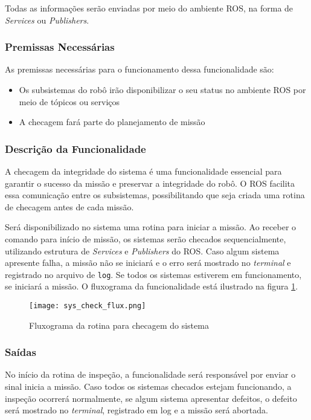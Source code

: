 Todas as informações serão enviadas por meio do ambiente ROS, na forma de \textit{Services} ou \textit{Publishers}.

\subsubsection{Premissas Necessárias}
As premissas necessárias para o funcionamento dessa funcionalidade são:
\begin{itemize}
	\item Os subsistemas do robô irão disponibilizar o seu status no ambiente ROS por meio de tópicos ou serviços
	\item A checagem fará parte do planejamento de missão
\end{itemize}

\subsubsection{Descrição da Funcionalidade}
A checagem da integridade do sistema é uma funcionalidade essencial para garantir o sucesso da missão e preservar a integridade do robô. O ROS facilita essa comunicação entre os subsistemas, possibilitando que seja criada uma rotina de checagem antes de cada missão.

Será disponibilizado no sistema uma rotina para iniciar a missão. Ao receber o comando para início de missão, os sistemas serão checados sequencialmente, utilizando estrutura de \textit{Services} e \textit{Publishers} do ROS. Caso algum sistema apresente falha, a missão não se iniciará e o erro será mostrado no \textit{terminal} e registrado no arquivo de \verb|log|. Se todos os sistemas estiverem em funcionamento, se iniciará a missão. O fluxograma da funcionalidade está ilustrado na figura \ref{fig:sys_check_flux}.	
\begin{figure}[h]
	\centering
	\texttt{[image: sys\_check\_flux.png]}
	\caption{Fluxograma da rotina para checagem do sistema}
	\label{fig:sys_check_flux}
\end{figure} 


\subsubsection{Saídas}
No início da rotina de inspeção, a funcionalidade será responsável por enviar o sinal inicia a missão. Caso todos os sistemas checados estejam funcionando, a inspeção ocorrerá normalmente, se algum sistema apresentar defeitos, o defeito será mostrado no \textit{terminal}, registrado em log e a missão será abortada.


